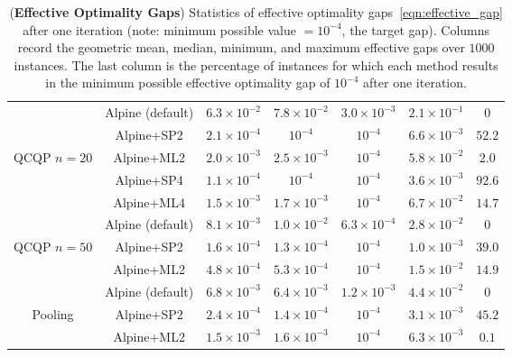 \documentclass{article}
\begin{document}
\begin{table}[t]
\begin{tabular}{ c | c | c c c c | c }
&  Alpine (default)  &  $6.3 \times 10^{-2}$  &  $7.8 \times 10^{-2}$  &  $3.0 \times 10^{-3}$  &  $2.1 \times 10^{-1}$  &  $0$ \\
&  Alpine+SP2  &  $2.1 \times 10^{-4}$  &  $10^{-4}$  &  $10^{-4}$  &  $6.6 \times 10^{-3}$  &  $52.2$ \\
QCQP $n = 20$  &  Alpine+ML2  &  $2.0 \times 10^{-3}$  &  $2.5 \times 10^{-3}$  &  $10^{-4}$  &  $5.8 \times 10^{-2}$  &  $2.0$ \\
&  Alpine+SP4  &  $1.1 \times 10^{-4}$  &  $10^{-4}$  &  $10^{-4}$  &  $3.6 \times 10^{-3}$  &  $92.6$ \\
&  Alpine+ML4  &  $1.5 \times 10^{-3}$  &  $1.7 \times 10^{-3}$  &  $10^{-4}$  &  $6.7 \times 10^{-2}$  &  $14.7$ \\[0.1in]
&  Alpine (default)  &  $8.1 \times 10^{-3}$  &  $1.0 \times 10^{-2}$  &  $6.3 \times 10^{-4}$  &  $2.8 \times 10^{-2}$ & $0$  \\
QCQP $n = 50$ &  Alpine+SP2  &  $1.6 \times 10^{-4}$  &  $1.3 \times 10^{-4}$  &  $10^{-4}$  &  $1.0 \times 10^{-3}$ & $39.0$ \\
&  Alpine+ML2  &  $4.8 \times 10^{-4}$  &  $5.3 \times 10^{-4}$  &  $10^{-4}$  &  $1.5 \times 10^{-2}$ & $14.9$ \\[0.1in]
&  Alpine (default)  &  $6.8 \times 10^{-3}$  &  $6.4 \times 10^{-3}$  &  $1.2 \times 10^{-3}$  &  $4.4 \times 10^{-2}$ & $0$  \\
Pooling &  Alpine+SP2  &  $2.4 \times 10^{-4}$  &  $1.4 \times 10^{-4}$  &  $10^{-4}$  &  $3.1 \times 10^{-3}$ & $45.2$ \\
&  Alpine+ML2  &  $1.5 \times 10^{-3}$  &  $1.6 \times 10^{-3}$  &  $10^{-4}$  &  $6.3 \times 10^{-3}$ & $0.1$ \\ \hline
\end{tabular}%
\caption{
(\textbf{Effective Optimality Gaps}) Statistics of effective optimality gaps~\eqref{eqn:effective_gap} after one iteration (note: minimum possible value $= 10^{-4}$, the target gap). 
Columns record the geometric mean, median, minimum, and maximum effective gaps over $1000$ instances. 
The last column is the percentage of instances for which each method results in the minimum possible effective optimality gap of $10^{-4}$ after one iteration.
}
\label{tab:alpine_gaps}
\end{table}
\end{document}

